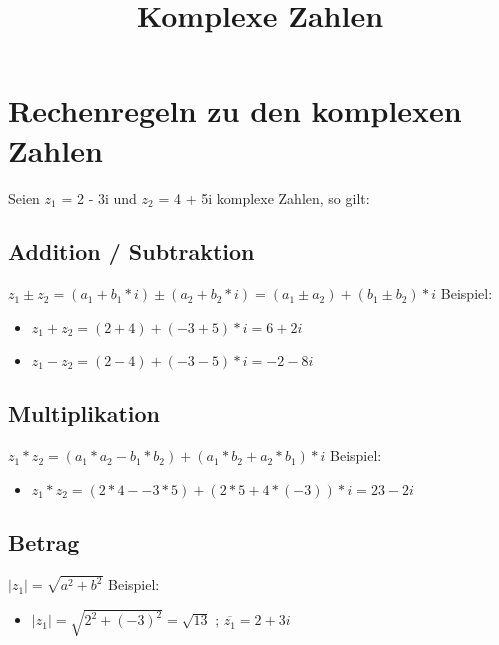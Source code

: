 \documentclass[12pt]{article}
\begin{document}
    \title{Komplexe Zahlen}
    \maketitle
    \section{Rechenregeln zu den komplexen Zahlen}

    Seien $z_1$ = 2 - 3i und $z_2$ = 4 + 5i komplexe Zahlen, so gilt: \newline

    \subsection{Addition / Subtraktion}

    $z_1 \pm z_2 = (a_1 + b_1 * i) \pm (a_2 + b_2 * i) = (a_1 \pm a_2) + (b_1 \pm b_2) * i$ \newline
    \newline
    Beispiel:
    \begin{itemize}
        \item $z_1 + z_2 = (2 + 4) + (-3 + 5) * i = 6 + 2i$
        \item $z_1 - z_2 = (2 - 4) + (-3 - 5) * i = -2 - 8i$
    \end{itemize}


    \subsection{Multiplikation}

    $ z_1 * z_2 = (a_1 * a_2 - b_1 * b_2) + (a_1*b_2 + a_2 *b_1) * i$ \newline
    \newline
    Beispiel:

    \begin{itemize}
        \item $z_1 * z_2 = (2 * 4 - -3 * 5) + (2 * 5 + 4 * (-3)) * i = 23 - 2i$
    \end{itemize}

    \subsection{Betrag}

    $|z_1| = \sqrt{a^2 + b^2}$  \newline
    \newline
    Beispiel:
    \begin{itemize}
        \item $|z_1| = \sqrt{2^2 + (-3)^2} = \sqrt{13}$ ; $\overline{z_1} = 2 + 3i$
    \end{itemize}
\end{document}
